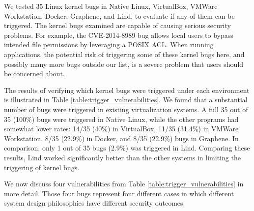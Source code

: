We tested 35 Linux kernel bugs in Native Linux, VirtualBox, VMWare
Workstation, Docker, Graphene, 
and Lind, to evaluate if any of them can be triggered. The kernel bugs
examined 
are capable of causing serious security problems. For example, 
the CVE-2014-8989 bug allows local users to bypass intended file
permissions by leveraging a POSIX ACL. 
When running applications, the potential risk of triggering some of these
kernel bugs here, 
and possibly many more bugs outside our list, is a severe problem that
users should be concerned about.

The results of verifying which kernel bugs were triggered under each
environment is illustrated in Table \ref{table:trigger_vulnerabilities}. 
We found that a substantial number of bugs were triggered in existing
virtualization systems. 
A full 35 out of 35 (100\%) bugs were triggered in Native Linux, 
while the other programs had somewhat lower rates: 14/35 (40\%) in
VirtualBox, 
11/35 (31.4\%)  in VMWare Workstation, 8/35 (22.9\%)  in Docker, and 8/35
(22.9\%) bugs in Graphene. 
In comparison, only 1 out of 35 bugs  (2.9\%)  was triggered in Lind. 
Comparing these results, Lind worked significantly better than the other
systems in limiting the triggering of kernel bugs.

We now discuss four vulnerabilities from Table \ref{table:trigger_vulnerabilities} 
in more detail. Those four bugs represent four different cases in which 
different system design philosophies have different security outcomes. 

